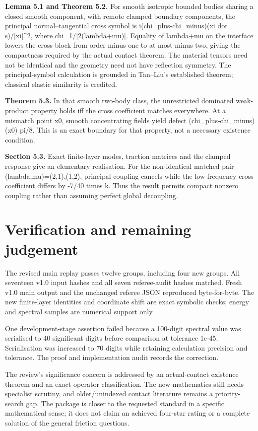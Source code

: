 \documentclass[11pt,a4paper]{article}
\begin{document}
\textbf{Lemma 5.1 and Theorem 5.2.} For smooth isotropic bounded bodies sharing a closed smooth component, with remote clamped boundary components, the principal normal–tangential cross symbol is i(chi\_plus-chi\_minus)(xi dot s)/|xi|\textasciicircum{}2, where chi=1/[2(lambda+mu)]. Equality of lambda+mu on the interface lowers the cross block from order minus one to at most minus two, giving the compactness required by the actual contact theorem. The material tensors need not be identical and the geometry need not have reflection symmetry. The principal-symbol calculation is grounded in Tan–Liu's established theorem; classical elastic similarity is credited.

\textbf{Theorem 5.3.} In that smooth two-body class, the unrestricted dominated weak-product property holds iff the cross coefficient matches everywhere. At a mismatch point x0, smooth concentrating fields yield defect (chi\_plus-chi\_minus)(x0) pi/8. This is an exact boundary for that property, not a necessary existence condition.

\textbf{Section 5.3.} Exact finite-layer modes, traction matrices and the clamped response give an elementary realisation. For the non-identical matched pair (lambda,mu)=(2,1),(1,2), principal coupling cancels while the low-frequency cross coefficient differs by -7/40 times k. Thus the result permits compact nonzero coupling rather than assuming perfect global decoupling.

\section*{Verification and remaining judgement}

The revised main replay passes twelve groups, including four new groups. All seventeen v1.0 input hashes and all seven referee-audit hashes matched. Fresh v1.0 main output and the unchanged referee JSON reproduced byte-for-byte. The new finite-layer identities and coordinate shift are exact symbolic checks; energy and spectral samples are numerical support only.

One development-stage assertion failed because a 100-digit spectral value was serialised to 40 significant digits before comparison at tolerance 1e-45. Serialisation was increased to 70 digits while retaining calculation precision and tolerance. The proof and implementation audit records the correction.

The review's significance concern is addressed by an actual-contact existence theorem and an exact operator classification. The new mathematics still needs specialist scrutiny, and older/unindexed contact literature remains a priority-search gap. The package is closer to the requested standard in a specific mathematical sense; it does not claim an achieved four-star rating or a complete solution of the general friction questions.
\end{document}

